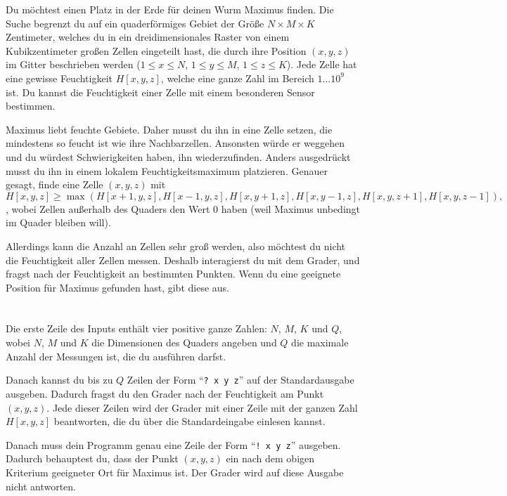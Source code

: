 \ifx\boi\undefined\fi
\def\version{jury-1}

Du möchtest einen Platz in der Erde für deinen Wurm Maximus finden. Die Suche begrenzt du auf ein quaderförmiges Gebiet der Größe $N \times M \times K$ Zentimeter, welches du in ein dreidimensionales Raster von einem Kubikzentimeter großen Zellen eingeteilt hast, die durch ihre Position $(x,y,z)$ im Gitter beschrieben werden ($1 \le x \le N$, $1 \le y \le M$, $1 \le z \le K$).
Jede Zelle hat eine gewisse Feuchtigkeit $H[x,y,z]$, welche eine ganze Zahl im Bereich $1 \dots 10^9$ ist.
Du kannst die Feuchtigkeit einer Zelle mit einem besonderen Sensor bestimmen.

Maximus liebt feuchte Gebiete. Daher musst du ihn in eine Zelle setzen, die mindestens so feucht ist wie ihre Nachbarzellen. Ansonsten würde er weggehen und du würdest Schwierigkeiten haben, ihn wiederzufinden.
Anders ausgedrückt musst du ihn in einem lokalem Feuchtigkeitsmaximum platzieren. Genauer gesagt, finde eine Zelle $(x,y,z)$ mit
$$
H[x,y,z] \ge \max(H[x+1,y,z], H[x-1,y,z], H[x,y+1,z], H[x,y-1,z], H[x,y,z+1], H[x,y,z-1]),
$$,
wobei Zellen außerhalb des Quaders den Wert $0$ haben (weil Maximus unbedingt im Quader bleiben will).

Allerdings kann die Anzahl an Zellen sehr groß werden, also möchtest du nicht die Feuchtigkeit aller Zellen messen.
Deshalb interagierst du mit dem Grader, und fragst nach der Feuchtigkeit an bestimmten Punkten.
Wenn du eine geeignete Position für Maximus gefunden hast, gibt diese aus.

\section*{\interactivity}
Die erste Zeile des Inputs enthält vier positive ganze Zahlen: $N$, $M$, $K$ und $Q$, wobei $N$, $M$ und $K$ die Dimensionen des Quaders angeben und $Q$ die maximale Anzahl der Messungen ist, die du ausführen darfst.

Danach kannst du bis zu $Q$ Zeilen der Form ``\texttt{?\ x y z}'' auf der Standardausgabe ausgeben.
Dadurch fragst du den Grader nach der Feuchtigkeit am Punkt $(x, y, z)$.
Jede dieser Zeilen wird der Grader mit einer Zeile mit der ganzen Zahl $H[x,y,z]$ beantworten, die du über die Standardeingabe einlesen kannst. 

Danach muss dein Programm genau eine Zeile der Form ``\texttt{!\ x y z}'' ausgeben.
Dadurch behauptest du, dass der Punkt $(x, y, z)$ ein nach dem obigen Kriterium geeigneter Ort für Maximus ist.
Der Grader wird auf diese Ausgabe nicht antworten.

